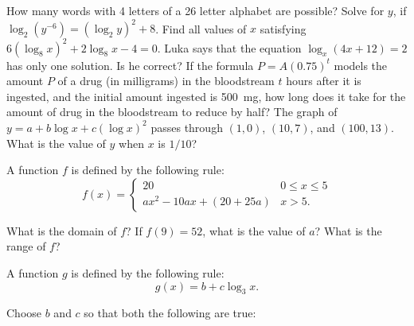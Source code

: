 \begin{questions}
  \question How many words with 4 letters of a 26 letter alphabet are possible?
  \question Solve for $ y $, if $ \log_2 (y^{-6}) = (\log_2 y)^2 + 8 $.
  \question Find all values of $ x $ satisfying $ 6(\log_8 x)^2 + 2 \log_8 x - 4 = 0 $.
  \question Luka says that the equation $ \log_x (4x + 12) = 2 $ has only one solution. Is he correct?
  \question If the formula $ P = A(0.75)^t $ models the amount $ P $ of a drug (in milligrams) in the bloodstream $ t $ hours after it
            is ingested, and the initial amount ingested is \SI{500}{\milli\gram}, how long does it take for the amount of drug in the
            bloodstream to reduce by half?
  \question The graph of $ y = a + b\log x + c (\log x)^2 $ passes through $ (1,0) $, $ (10, 7) $, and $ (100, 13) $.
            What is the value of $ y $ when $ x $ is $ 1/10 $?
  \question
    \begin{parts}
      \item A function $ f $ is defined by the following rule:
            \begin{displaymath}
              f(x) = \begin{cases}
                      20 & 0 \leq x \leq 5\\
                      ax^2 - 10ax + (20 + 25a) & x > 5.
                    \end{cases}
            \end{displaymath}
        \begin{subparts}
          \subpart What is the domain of $ f $?
          \subpart If $ f(9) = 52 $, what is the value of $ a $?
          \subpart What is the range of $ f $?
        \end{subparts}
      \item A function $ g $ is defined by the following rule:
            \begin{displaymath}
              g(x) = b + c\log_3 x.
            \end{displaymath}
        \begin{subparts}
          \subpart Choose $ b $ and $ c $ so that both the following are true:
            \begin{itemize}

\end{itemize}
\end{subparts}
\end{parts}
\end{questions}
